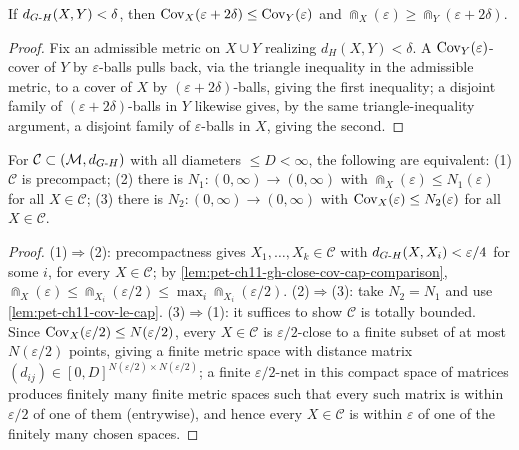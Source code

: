 \begin{lemma}
  \label{lem:pet-ch11-gh-close-cov-cap-comparison}
  If $d_{G\text{-}H}(X,Y)<\delta$, then
  $\operatorname{Cov}_X(\varepsilon+2\delta)\le\operatorname{Cov}_Y(\varepsilon)$ and
  $\Cap_X(\varepsilon)\ge\Cap_Y(\varepsilon+2\delta)$.
\end{lemma}
\begin{proof}
  Fix an admissible metric on $X\cup Y$ realizing $d_H(X,Y)<\delta$. A
  $\operatorname{Cov}_Y(\varepsilon)$-cover of $Y$ by $\varepsilon$-balls pulls back, via
  the triangle inequality in the admissible metric, to a cover of $X$ by
  $(\varepsilon+2\delta)$-balls, giving the first inequality; a disjoint
  family of $(\varepsilon+2\delta)$-balls in $Y$ likewise gives, by the same
  triangle-inequality argument, a disjoint family of $\varepsilon$-balls in
  $X$, giving the second.
\end{proof}

\begin{proposition}
  \label{prop:pet-ch11-gromov-precompactness-criterion}
  For $\mathcal{C}\subset(\mathcal{M},d_{G\text{-}H})$ with all diameters $\le D<\infty$,
  the following are equivalent: (1) $\mathcal{C}$ is precompact; (2) there is
  $N_1:(0,\infty)\to(0,\infty)$ with $\Cap_X(\varepsilon)\le N_1(\varepsilon)$
  for all $X\in\mathcal{C}$; (3) there is $N_2:(0,\infty)\to(0,\infty)$ with
  $\operatorname{Cov}_X(\varepsilon)\le N_2(\varepsilon)$ for all $X\in\mathcal{C}$.
\end{proposition}
\begin{proof}
  (1)$\Rightarrow$(2): precompactness gives $X_1,\dots,X_k\in\mathcal{C}$ with
  $d_{G\text{-}H}(X,X_i)<\varepsilon/4$ for some $i$, for every $X\in\mathcal{C}$; by
  \cref{lem:pet-ch11-gh-close-cov-cap-comparison},
  $\Cap_X(\varepsilon)\le\Cap_{X_i}(\varepsilon/2)\le\max_i\Cap_{X_i}(\varepsilon/2)$.
  (2)$\Rightarrow$(3): take $N_2=N_1$ and use
  \cref{lem:pet-ch11-cov-le-cap}. (3)$\Rightarrow$(1): it suffices to show
  $\mathcal{C}$ is totally bounded. Since
  $\operatorname{Cov}_X(\varepsilon/2)\le N(\varepsilon/2)$, every $X\in\mathcal{C}$ is
  $\varepsilon/2$-close to a finite subset of at most $N(\varepsilon/2)$
  points, giving a finite metric space with distance matrix
  $(d_{ij})\in[0,D]^{N(\varepsilon/2)\times N(\varepsilon/2)}$; a finite
  $\varepsilon/2$-net in this compact space of matrices produces finitely
  many finite metric spaces such that every such matrix is within
  $\varepsilon/2$ of one of them (entrywise), and hence every $X\in\mathcal{C}$
  is within $\varepsilon$ of one of the finitely many chosen spaces.
\end{proof}

